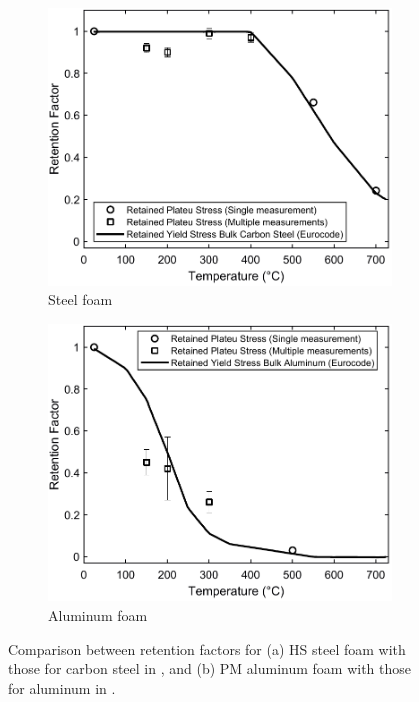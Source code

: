 \documentclass[review]{elsarticle}
\begin{document}
\begin{figure}
	\centering
	\begin{subfigure}{0.50\textwidth}
		\centering
		\includegraphics[width=0.90\linewidth]
		{Tex-Figures/Fig23a-retentionFactor-Fe.pdf}
		\caption{Steel foam}
		\label{fig:retention_Steel}
	\end{subfigure}%
	\begin{subfigure}{0.50\textwidth}
		\centering
		\includegraphics[width=0.90\linewidth]
		{Tex-Figures/Fig23b-retentionFactor-Al.pdf}
		\caption{Aluminum foam}
		\label{retention_Al}
	\end{subfigure}
	\caption{Comparison between retention factors for (a) HS steel foam with those for carbon steel in \cite{EC3-1-2}, and (b) PM aluminum foam with those for aluminum in \cite{EC3-1-2}.}
	\label{fig:retention}
\end{figure}
\end{document}

